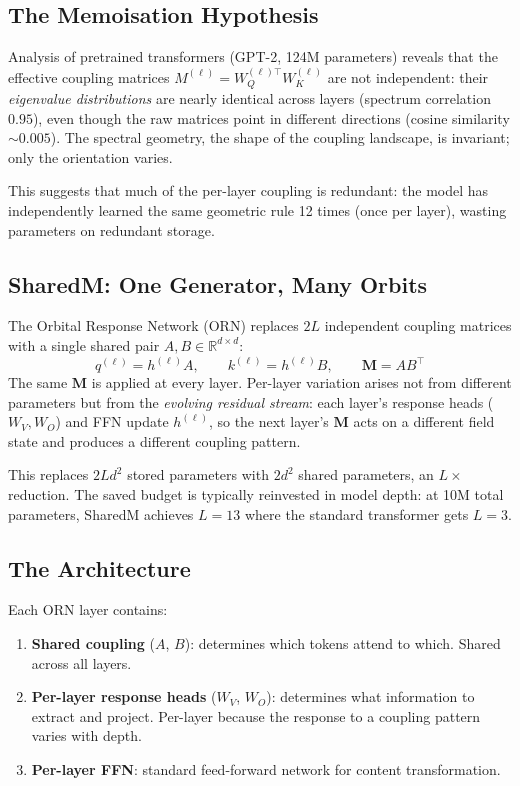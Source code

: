 \documentclass[11pt, a4paper]{article}
\newcommand{\M}{\mathbf{M}}
\newcommand{\R}{\mathbb{R}}
\theoremstyle{plain}
\theoremstyle{remark}
\begin{document}
\subsection{The Memoisation Hypothesis}

Analysis of pretrained transformers (GPT-2, 124M parameters) reveals that the effective coupling matrices $M^{(\ell)} = W_Q^{(\ell)\top} W_K^{(\ell)}$ are not independent: their \emph{eigenvalue distributions} are nearly identical across layers (spectrum correlation $0.95$), even though the raw matrices point in different directions (cosine similarity ${\sim}0.005$).
The spectral geometry, the shape of the coupling landscape, is invariant; only the orientation varies.

This suggests that much of the per-layer coupling is redundant: the model has independently learned the same geometric rule 12 times (once per layer), wasting parameters on redundant storage.

\subsection{SharedM: One Generator, Many Orbits}

The Orbital Response Network (ORN) replaces $2L$ independent coupling matrices with a single shared pair $A, B \in \R^{d \times d}$:
\begin{equation}
    q^{(\ell)} = h^{(\ell)} A, \qquad k^{(\ell)} = h^{(\ell)} B, \qquad \M = AB^\top
\end{equation}
The same $\M$ is applied at every layer.
Per-layer variation arises not from different parameters but from the \emph{evolving residual stream}: each layer's response heads ($W_V, W_O$) and FFN update $h^{(\ell)}$, so the next layer's $\M$ acts on a different field state and produces a different coupling pattern.

This replaces $2Ld^2$ stored parameters with $2d^2$ shared parameters, an $L\times$ reduction.
The saved budget is typically reinvested in model depth: at 10M total parameters, SharedM achieves $L{=}13$ where the standard transformer gets $L{=}3$.

\subsection{The Architecture}

Each ORN layer contains:
\begin{enumerate}[nosep]
    \item \textbf{Shared coupling} ($A$, $B$): determines which tokens attend to which. Shared across all layers.
    \item \textbf{Per-layer response heads} ($W_V$, $W_O$): determines what information to extract and project. Per-layer because the response to a coupling pattern varies with depth.
    \item \textbf{Per-layer FFN}: standard feed-forward network for content transformation.
\end{enumerate}
\end{document}
